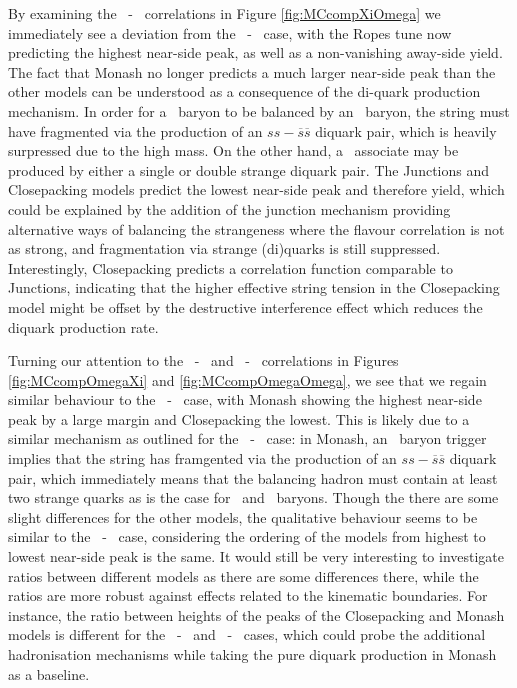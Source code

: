   By examining the \Xi\ - \Omega\ correlations in Figure \ref{fig:MCcompXiOmega} we immediately see a deviation from the \Xi\ - \Xi\ case, with the Ropes tune now predicting the highest near-side peak, as well as a non-vanishing away-side yield. The fact that Monash no longer predicts a much larger near-side peak than the other models can be understood as a consequence of the di-quark production mechanism. In order for a \Xi\ baryon to be balanced by an \Omega\ baryon, the string must have fragmented via the production of an $ss - \overline{s}\overline{s}$ diquark pair, which is heavily surpressed due to the high mass. On the other hand, a \Xi\ associate may be produced by either a single or double strange diquark pair. The Junctions and Closepacking models predict the lowest near-side peak and therefore  yield, which could be explained by the addition of the junction mechanism providing alternative ways of balancing the strangeness where the flavour correlation is not as strong, and fragmentation via strange (di)quarks is still suppressed. Interestingly, Closepacking predicts a correlation function comparable to Junctions, indicating that the higher effective string tension in the Closepacking model might be offset by the destructive interference effect which reduces the diquark production rate. 

  Turning our attention to the \Omega\ - \Xi\ and \Omega\ - \Omega\ correlations in Figures \ref{fig:MCcompOmegaXi} and \ref{fig:MCcompOmegaOmega}, we see that we regain similar behaviour to the \Xi\ - \Xi\ case, with Monash showing the highest near-side peak by a large margin and Closepacking the lowest. This is likely due to a similar mechanism as outlined for the \Xi\ - \Omega\ case: in Monash, an \Omega\ baryon trigger implies that the string has framgented via the production of an $ss - \overline{s}\overline{s}$ diquark pair, which immediately means that the balancing hadron must contain at least two strange quarks as is the case for \Xi\ and \Omega\ baryons. Though the there are some slight differences for the other models, the qualitative behaviour seems to be similar to the \Xi\ - \Xi\ case, considering the ordering of the models from highest to lowest near-side peak is the same. It would still be very interesting to investigate ratios between different models as there are some differences there, while the ratios are more robust against effects related to the kinematic boundaries. For instance, the ratio between heights of the peaks of the Closepacking and Monash models is different for the \Xi\ - \Xi\ and \Omega\ - \Xi\ cases, which could probe the additional hadronisation mechanisms while taking the pure diquark production in Monash as a baseline. 

